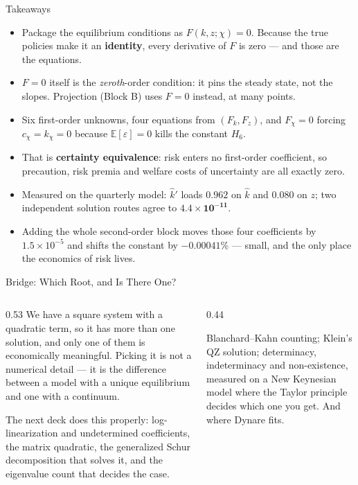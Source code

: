 \begin{frame}{Takeaways}
\begin{takeawaybox}
\begin{itemize}\small
  \item Package the equilibrium conditions as $F(k,z;\chi)=0$. Because the true policies make it an \textbf{identity}, every derivative of $F$ is zero --- and those are the equations.
  \item $F=0$ itself is the \emph{zeroth}-order condition: it pins the steady state, not the slopes. Projection (Block B) uses $F=0$ instead, at many points.
  \item Six first-order unknowns, four equations from $(F_k,F_z)$, and $F_\chi=0$ forcing $c_\chi=k_\chi=0$ because $\mathbb{E}[\varepsilon]=0$ kills the constant $H_6$.
  \item That is \textbf{certainty equivalence}: risk enters no first-order coefficient, so precaution, risk premia and welfare costs of uncertainty are all exactly zero.
  \item Measured on the quarterly model: $\hat{k}'$ loads $\mathbf{0.962}$ on $\hat{k}$ and $0.080$ on $z$; two independent solution routes agree to $\mathbf{4.4\times10^{-11}}$.
  \item Adding the whole second-order block moves those four coefficients by $1.5\times10^{-5}$ and shifts the constant by $-0.00041\%$ --- small, and the only place the economics of risk lives.
\end{itemize}
\end{takeawaybox}
\end{frame}

\begin{frame}{Bridge: Which Root, and Is There One?}
\begin{columns}[T]
\begin{column}{0.53\textwidth}
\small
We have a square system with a quadratic term, so it has more than one solution, and only one of them is economically meaningful. Picking it is not a numerical detail --- it is the difference between a model with a unique equilibrium and one with a continuum.
\medskip

The next deck does this properly: log-linearization and undetermined coefficients, the matrix quadratic, the generalized Schur decomposition that solves it, and the eigenvalue count that decides the case.
\end{column}
\begin{column}{0.44\textwidth}
\begin{conceptbox}[title=\textbf{Next (5.A4)}]\small
Blanchard--Kahn counting; Klein's QZ solution; determinacy, indeterminacy and non-existence, measured on a New Keynesian model where the Taylor principle decides which one you get. And where Dynare fits.
\end{conceptbox}
\end{column}
\end{columns}
\end{frame}


